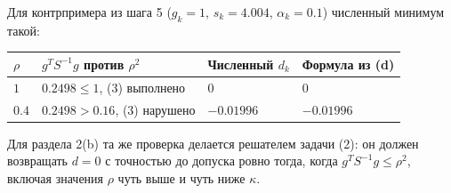 \documentclass[11pt,a4paper]{article}
\begin{document}
Для контрпримера из шага 5 ($g_k = 1$, $s_k = 4.004$, $\alpha_k = 0.1$) численный
минимум такой:

\begin{center}
\begin{tabular}{@{}llll@{}}
\toprule
$\rho$ & $g^TS^{-1}g$ против $\rho^2$ & Численный $d_k$ & Формула из (d) \\
\midrule
$1$ & $0.2498 \le 1$, (3) выполнено & $0$ & $0$ \\
$0.4$ & $0.2498 > 0.16$, (3) нарушено & $-0.01996$ & $-0.01996$ \\
\bottomrule
\end{tabular}
\end{center}

Для раздела 2(b) та же проверка делается решателем задачи (2): он должен возвращать
$d = 0$ с точностью до допуска ровно тогда, когда $g^TS^{-1}g \le \rho^2$, включая
значения $\rho$ чуть выше и чуть ниже $\kappa$.
\end{document}
